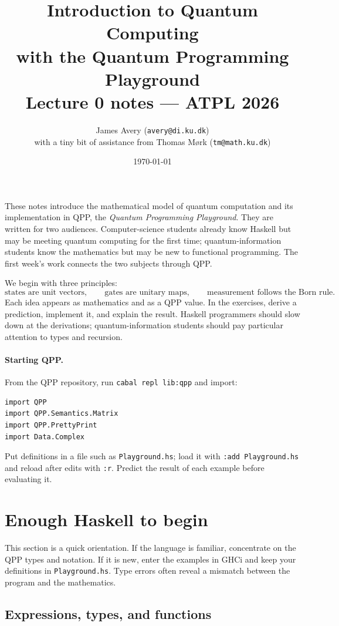 \documentclass[11pt,a4paper]{article}
\title{Introduction to Quantum Computing\\
       {\large with the Quantum Programming Playground}\\[1ex]
       {\normalsize Lecture 0 notes --- ATPL 2026}}
\author{James Avery (\texttt{avery@di.ku.dk}) \\ with a tiny bit of assistance from Thomas Mørk (\texttt{tm@math.ku.dk})}
\date{\today}
\theoremstyle{definition}
\begin{document}
\maketitle

These notes introduce the mathematical model of quantum computation and its
implementation in QPP, the \emph{Quantum Programming Playground}.  They are
written for two audiences.  Computer-science students already know Haskell
but may be meeting quantum computing for the first time; quantum-information
students know the mathematics but may be new to functional programming.
The first week's work connects the two subjects through QPP.

We begin with three principles:
\[
  \text{states are unit vectors},\qquad
  \text{gates are unitary maps},\qquad
  \text{measurement follows the Born rule}.
\]
Each idea appears as mathematics and as a QPP value.  In the exercises, derive
a prediction, implement it, and explain the result.  Haskell programmers
should slow down at the derivations; quantum-information students should pay
particular attention to types and recursion.

\paragraph{Starting QPP.}
From the QPP repository, run \lstinline|cabal repl lib:qpp| and import:
\begin{lstlisting}
import QPP
import QPP.Semantics.Matrix
import QPP.PrettyPrint
import Data.Complex
\end{lstlisting}
Put definitions in a file such as \texttt{Playground.hs}; load it with
\lstinline|:add Playground.hs| and reload after edits with \lstinline|:r|.
Predict the result of each example before evaluating it.

\section{Enough Haskell to begin}
\label{sec:haskell}

This section is a quick orientation.
If the language is familiar, concentrate on the QPP types and notation.  If
it is new, enter the examples in GHCi and keep your definitions in
\texttt{Playground.hs}.  Type errors often reveal a mismatch between the
program and the mathematics.

\subsection{Expressions, types, and functions}
\end{document}
